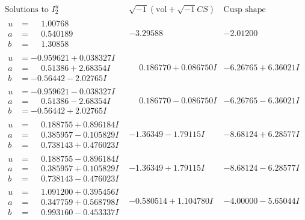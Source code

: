 \documentclass[1p]{elsarticle_modified}
\theoremstyle{definition}
\newcommand{\I}{\sqrt{-1}}
\begin{document}
$$\begin{array}{c|c|c}  
\text{Solutions to }I^u_{2}& \I (\text{vol} + \sqrt{-1}CS) & \text{Cusp shape}\\
 \hline 
\begin{aligned}
u &= \phantom{-}1.00768\phantom{ +0.000000I} \\
a &= \phantom{-}0.540189\phantom{ +0.000000I} \\
b &= \phantom{-}1.30858\phantom{ +0.000000I}\end{aligned}
 & -3.29588\phantom{ +0.000000I} & -2.01200\phantom{ +0.000000I} \\ \hline\begin{aligned}
u &= -0.959621 + 0.038327 I \\
a &= \phantom{-}0.51386 + 2.68354 I \\
b &= -0.56442 - 2.02765 I\end{aligned}
 & \phantom{-}0.186770 + 0.086750 I & -6.26765 + 6.36021 I \\ \hline\begin{aligned}
u &= -0.959621 - 0.038327 I \\
a &= \phantom{-}0.51386 - 2.68354 I \\
b &= -0.56442 + 2.02765 I\end{aligned}
 & \phantom{-}0.186770 - 0.086750 I & -6.26765 - 6.36021 I \\ \hline\begin{aligned}
u &= \phantom{-}0.188755 + 0.896184 I \\
a &= \phantom{-}0.385957 - 0.105829 I \\
b &= \phantom{-}0.738143 + 0.476023 I\end{aligned}
 & -1.36349 - 1.79115 I & -8.68124 + 6.28577 I \\ \hline\begin{aligned}
u &= \phantom{-}0.188755 - 0.896184 I \\
a &= \phantom{-}0.385957 + 0.105829 I \\
b &= \phantom{-}0.738143 - 0.476023 I\end{aligned}
 & -1.36349 + 1.79115 I & -8.68124 - 6.28577 I \\ \hline\begin{aligned}
u &= \phantom{-}1.091200 + 0.395456 I \\
a &= \phantom{-}0.347759 + 0.568798 I \\
b &= \phantom{-}0.993160 - 0.453337 I\end{aligned}
 & -0.580514 + 1.104780 I & -4.00000 - 5.65044 I \\ \hline\begin{aligned}

\end{aligned}
\end{array}$$
\end{document}
